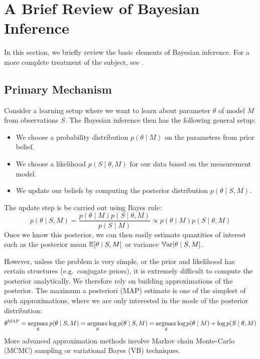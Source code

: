 \section{A Brief Review of Bayesian Inference}

In this section, we briefly review the basic elements of Bayesian inference. For
a more complete treatment of the subject, see \cite{bishop2006pattern,
ghahramani2015probabilistic}.

\subsection{Primary Mechanism}

Consider a learning setup where we want to learn about parameter $\theta$ of
model $M$ from observations $S$. The Bayesian inference then has the following
general setup:
\begin{itemize}
  \item
    We choose a probability distribution $p(\theta \mid M)$ on the parameters
    from prior belief.
  \item
    We choose a likelihood $p(S \mid \theta, M)$ for our data based on the
    measurement model.
  \item
    We update our beliefs by computing the posterior distribution $p(\theta \mid
    S, M)$.
\end{itemize}
The update step is be carried out using Bayes rule:
\begin{equation}
  \label{eq:bayes-update}
  p(\theta \mid S, M) = \frac{p(\theta \mid M) p(S \mid \theta, M)}{p(S \mid M)}
  \propto p(\theta \mid M) p(S \mid \theta, M)
\end{equation}
Once we know this posterior, we can then easily estimate quantities of interest
such as the posterior mean $\operatorname*{\mathbb{E}}[\theta \mid S, M]$ or variance $\operatorname*{\mathbb{V}ar}[\theta
\mid S, M]$.

However, unless the problem is very simple, or the prior and likelihood has
certain structures (e.g.\ conjugate priors), it is extremely difficult to
compute the posterior analytically. We therefore rely on building approximations
of the posterior. The maximum a posteriori (MAP) estimate is one of the simplest
of such approximations, where we are only interested in the mode of the
posterior distribution:
\begin{equation}
  \label{eq:map-estimate}
  \theta^\text{MAP} = \operatorname*{argmax}_\theta p(\theta \mid S, M) =
  \operatorname*{argmax}_\theta \log p(\theta \mid S, M) = \operatorname*{argmax}_\theta \log p(\theta \mid
  M) + \log p(S \mid \theta, M)
\end{equation}
More advanced approximation methods involve Markov chain Monte-Carlo (MCMC)
sampling or variational Bayes (VB) techniques.


